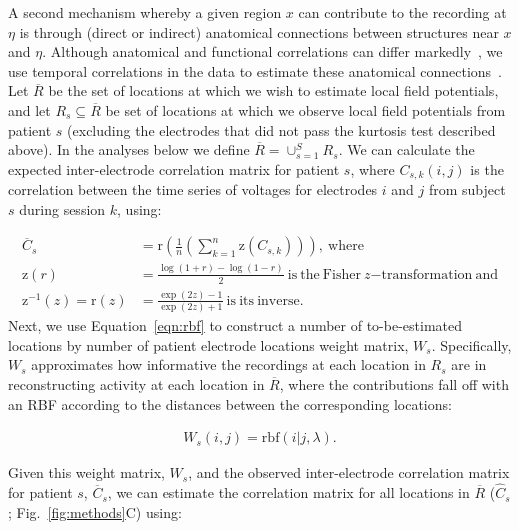 \documentclass[11pt]{article}
\begin{document}
A second mechanism whereby a given region $x$ can contribute to the recording at
$\eta$ is through (direct or indirect) anatomical connections between structures
near $x$ and $\eta$.  Although anatomical and functional correlations can differ
markedly~\citep[e.g.,][]{AdacEtal12, HoneEtal09, GoniEtal14}, we use temporal
correlations in the data to estimate these anatomical
connections~\citep{BeckEtal18}.  Let $\overline{R}$ be the set of locations at which
we wish to estimate local field potentials, and let $R_{s} \subseteq \overline{R}$ be
set of locations at which we observe local field potentials from patient $s$
(excluding the electrodes that did not pass the kurtosis test described above).
In the analyses below we define $\overline{R} = \cup_{s=1}^S R_s$.  We can calculate
the expected inter-electrode correlation matrix for patient $s$, where
$C_{s,k}(i,j)$ is the correlation between the time series of voltages for
electrodes $i$ and $j$ from subject $s$ during session $k$, using:

\begin{align}
  \overline{C}_{s} &=
  \mathrm{r}\left(\frac{1}{n}\left(\sum_{k=1}^{n}\mathrm{z}(C_{s,k})\right)\right),\label{eqn:inter_corr}~\mathrm{where}\\
  \mathrm{z}(r) &= \frac{\log(1+r) - \log(1 - r)}{2}~\mathrm{is~the~Fisher}~z
  \mathrm{-transformation~and}\label{eqn:fishersz}\\ \mathrm{z}^{-1}(z) =
  \mathrm{r}(z) &= \frac{\exp(2z) - 1}{\exp(2z) +
  1}\mathrm{~is~its~inverse}.\label{eqn:invfishersz} \end{align} Next, we use
  Equation~\ref{eqn:rbf} to construct a number of to-be-estimated locations by
  number of patient electrode locations weight matrix, $W_s$.  Specifically,
  $W_s$ approximates how informative the recordings at each location in $R_s$
  are in reconstructing activity at each location in $\overline{R}$, where the
  contributions fall off with an RBF according to the distances between the
  corresponding locations:

\begin{align}
W_s(i, j) = \mathrm{rbf}(i|j,\lambda)\label{eqn:weight_matrix}.
\end{align}

Given this weight matrix, $W_s$, and the observed inter-electrode correlation
matrix for patient $s$, $\overline{C}_{s}$, we can estimate the correlation matrix
for all locations in $\overline{R}$ ($\hat{C}_s$; Fig.~\ref{fig:methods}C) using:
\end{document}
